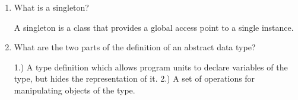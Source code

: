 \begin{enumerate}
  \item What is a singleton?

 \begin{answer}

    A singleton is a class that provides a global access point to a single instance.

    \end{answer}

  \item What are the two parts of the definition 
    of an abstract data type?

 \begin{answer}

    1.) A type definition which allows program units to declare variables of the 
type, but hides the representation of it.
    2.) A set of operations for manipulating objects of the type.

    \end{answer}

  \end{enumerate}


